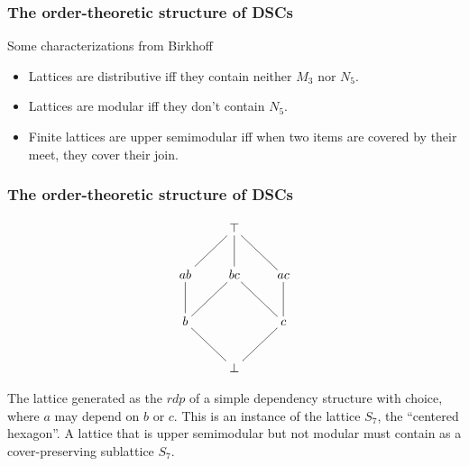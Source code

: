 \documentclass{beamer}
\begin{document}
\begin{frame}
\frametitle{The order-theoretic structure of DSCs}
Some characterizations from Birkhoff
\begin{itemize}
\item Lattices are distributive iff they contain neither \(M_3\) nor \(N_5\).
\item Lattices are modular iff they don't contain \(N_5\).
\item Finite lattices are upper semimodular iff when two items are covered by their meet, they cover their join.
\end{itemize}
\end{frame}

\begin{frame}
\frametitle{The order-theoretic structure of DSCs}
\begin{figure}
\begin{minipage}[c]{0.3\textwidth}
\begin{equation*}
    \xymatrix{& \top \ar@{-}[dl] \ar@{-}[d] \ar@{-}[dr] & \\
      ab \ar@{-}[d]& bc \ar@{-}[dl] \ar@{-}[dr] &
        ac \ar@{-}[d]  \\
        b \ar@{-}[dr]  & & c \ar@{-}[dl] \\
        & \bot &
        } 
\end{equation*}
\end{minipage}
\end{figure}

The lattice generated as the \(rdp\) of a simple dependency structure with choice, where \(a\) may depend on \(b\) or \(c\). This is an instance of the lattice \(S_7\), the ``centered hexagon''. A lattice that is upper semimodular but not modular must contain as a cover-preserving sublattice \(S_7\).
\end{frame}
\end{document}
